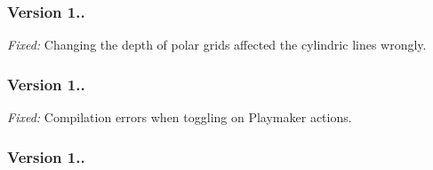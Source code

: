 \subsubsection*{Version 1..}


\begin{DoxyItemize}
\item {\itshape Fixed\+:} Changing the {\ttfamily depth} of polar grids affected the cylindric lines wrongly.
\end{DoxyItemize}

\subsubsection*{Version 1..}


\begin{DoxyItemize}
\item {\itshape Fixed\+:} Compilation errors when toggling on Playmaker actions.
\end{DoxyItemize}

\subsubsection*{Version 1..}

